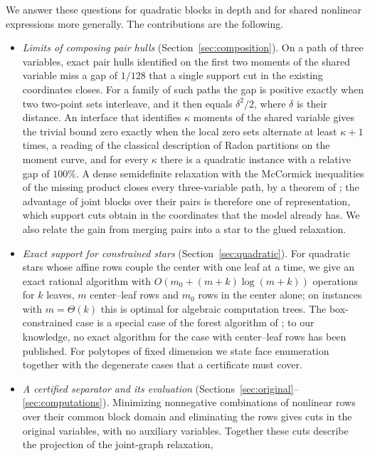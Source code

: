 We answer these questions for quadratic blocks in depth and for shared
nonlinear expressions more generally. The contributions are the following.

\begin{itemize}
\item \emph{Limits of composing pair hulls} (Section~\ref{sec:composition}). On
a path of three variables, exact pair hulls identified on the first two
moments of the shared variable miss a gap of $1/128$ that a single support
cut in the existing coordinates closes. For a family of such paths the gap is
positive exactly when two two-point sets interleave, and it then equals
$\delta^2/2$, where $\delta$ is their distance. An interface that identifies
$\kappa$ moments of the shared variable gives the trivial bound zero exactly
when the local zero sets alternate at least $\kappa+1$ times, a reading of the
classical description of Radon partitions on the moment curve, and for every
$\kappa$ there is a quadratic instance with a relative gap of $100\%$. A dense
semidefinite relaxation with the McCormick inequalities of the missing
product closes every three-variable path, by a theorem of
\citet{BurerNatarajanWillemsen2025}; the advantage of joint blocks over their
pairs is therefore one of representation, which support cuts obtain in the
coordinates that the model already has. We also relate the gain from merging
pairs into a star to the glued relaxation.
\item \emph{Exact support for constrained stars} (Section~\ref{sec:quadratic}).
For quadratic stars whose affine rows couple the center with one leaf at a
time, we give an exact rational algorithm with $O(m_0+(m+k)\log(m+k))$
operations for $k$ leaves, $m$ center--leaf rows and $m_0$ rows in the center
alone; on instances with $m=\Theta(k)$ this is optimal for algebraic
computation trees. The box-constrained case is a special case of the forest
algorithm of \citet{DelPiaKhajavirad2026}; to our knowledge, no exact
algorithm for the case with center--leaf rows has been published. For
polytopes of fixed dimension we state face enumeration together with the
degenerate cases that a certificate must cover.
\item \emph{A certified separator and its evaluation}
(Sections~\ref{sec:original}--\ref{sec:computations}). Minimizing nonnegative
combinations of nonlinear rows over their common block domain and eliminating
the rows gives cuts in the original variables, with no auxiliary variables.
Together these cuts describe the projection of the joint-graph relaxation,

\end{itemize}
